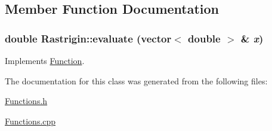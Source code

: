 \subsection{Member Function Documentation}
\hypertarget{classRastrigin_aba8c37ab1546da6e7ed47123d179673}{
\subsubsection{\setlength{\rightskip}{0pt plus 5cm}double Rastrigin::evaluate (vector$<$ double $>$ \& {\em x})}}
\label{classRastrigin_aba8c37ab1546da6e7ed47123d179673}




Implements \hyperlink{classFunction_9323a7309b16e0e168590e34b359ff32}{Function}.

The documentation for this class was generated from the following files:\begin{CompactItemize}
\item 
\hyperlink{Functions_8h}{Functions.h}\item 
\hyperlink{Functions_8cpp}{Functions.cpp}\end{CompactItemize}
